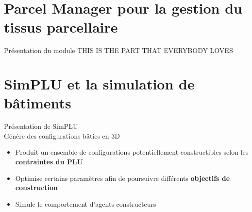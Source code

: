 \documentclass[xcolor=table]{beamer}
\begin{document}
\section[Parcel Manager]{Parcel Manager pour la gestion du tissus parcellaire}

\begin{frame}{Présentation du module}
THIS IS THE PART THAT EVERYBODY LOVES
\end{frame}




\section[SimPLU]{SimPLU et la simulation de bâtiments}



\begin{frame}{Présentation de SimPLU}
	\\
	Génère des configurations bâties en 3D
	\begin{itemize}
		\item Produit un ensemble de configurations potentiellement constructibles selon les \textbf{contraintes du PLU}
		\item Optimise certains paramètres afin de poursuivre différents \textbf{objectifs de construction}
		\item Simule le comportement d'agents constructeurs
	\end{itemize} 
\end{frame}
\end{document}
